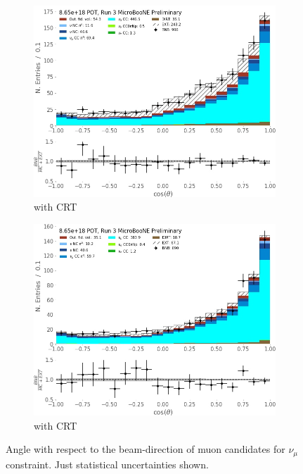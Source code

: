\begin{figure}[ht] 
\begin{center}
    \begin{subfigure}[b]{0.45\textwidth}
    \centering
    \includegraphics[width=1.00\textwidth]{NuMuCCsel/Images/Ryan/Run3_costheta_noCRT.jpg}
    \caption{\label{fig:NuMUCCsel:ryan:coswithCRT} with CRT}
    \end{subfigure}
    \begin{subfigure}[b]{0.45\textwidth}
    \centering
    \includegraphics[width=1.00\textwidth]{NuMuCCsel/Images/Ryan/Run3_costheta_withCRT.jpg}
    \caption{\label{fig:NuMUCCsel:ryan:cosnoCRT} with CRT}
    \end{subfigure}
\caption{Angle with respect to the beam-direction of muon candidates for $\nu_{\mu}$ constraint. Just statistical uncertainties shown.}
\end{center}
\end{figure}